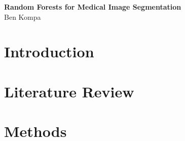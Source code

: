 \documentclass[11pt]{article}
\begin{document}
\begin{center}
\textbf{Random Forests for Medical Image Segmentation} \\ 
Ben Kompa
\end{center}

\section{Introduction}

\section{Literature Review}

\section{Methods} 
\end{document}
